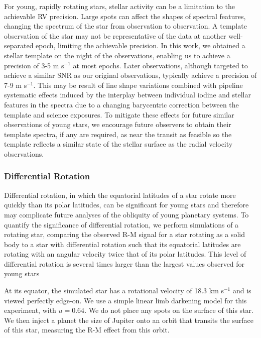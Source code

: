 \documentclass[twocolumn]{aastex63}
\begin{document}
For young, rapidly rotating stars, stellar activity can be a limitation to the achievable RV precision.
Large spots can affect the shapes of spectral features, changing the spectrum of the star from observation to observation. 
A template observation of the star may not be representative of the data at another well-separated epoch, limiting the achievable precision.
In this work, we obtained a stellar template on the night of the observations, enabling us to achieve a precision of 3-5 m s$^{-1}$ at most epochs. 
Later observations, although targeted to achieve a similar SNR as our original observations, typically achieve a precision of 7-9 m s$^{-1}$. 
This may be result of line shape variations combined with pipeline systematic effects induced by the interplay between individual iodine and stellar features in the spectra due to a changing barycentric correction between the template and science exposures.
To mitigate these effects for future similar observations of young stars, we encourage future observers to obtain their template spectra, if any are required, as near the transit as feasible so the template reflects a similar state of the stellar surface as the radial velocity observations.



\subsubsection{Differential Rotation}



Differential rotation, in which the equatorial latitudes of a star rotate more quickly than its polar latitudes, can be significant for young stars \citep{Waite17} and therefore may complicate future analyses of the obliquity of young planetary systems.
To quantify the significance of differential rotation, we perform simulations of a rotating star, comparing the observed R-M signal for a star rotating as a solid body to a star with differential rotation such that its equatorial latitudes are rotating with an angular velocity twice that of its polar latitudes. This level of differential rotation is several times larger than the largest values observed for young stars \citep[e.g.][]{Frohlich12}

At its equator, the simulated star has a rotational velocity of 18.3 km s$^{-1}$ and is viewed perfectly edge-on.
We use a simple linear limb darkening model for this experiment, with $u = 0.64$. 
We do not place any spots on the surface of this star.
We then inject a planet the size of Jupiter onto an orbit that transits the surface of this star, measuring the R-M effect from this orbit.
\end{document}
